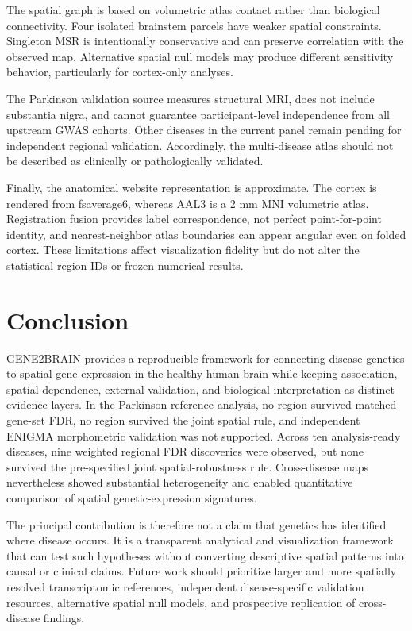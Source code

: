 \documentclass[10pt,twocolumn]{article}
\begin{document}
The spatial graph is based on volumetric atlas contact rather than biological connectivity. Four isolated brainstem parcels have weaker spatial constraints. Singleton MSR is intentionally conservative and can preserve correlation with the observed map. Alternative spatial null models may produce different sensitivity behavior, particularly for cortex-only analyses.

The Parkinson validation source measures structural MRI, does not include substantia nigra, and cannot guarantee participant-level independence from all upstream GWAS cohorts. Other diseases in the current panel remain pending for independent regional validation. Accordingly, the multi-disease atlas should not be described as clinically or pathologically validated.

Finally, the anatomical website representation is approximate. The cortex is rendered from fsaverage6, whereas AAL3 is a 2 mm MNI volumetric atlas. Registration fusion provides label correspondence, not perfect point-for-point identity, and nearest-neighbor atlas boundaries can appear angular even on folded cortex. These limitations affect visualization fidelity but do not alter the statistical region IDs or frozen numerical results.

\section{Conclusion}

GENE2BRAIN provides a reproducible framework for connecting disease genetics to spatial gene expression in the healthy human brain while keeping association, spatial dependence, external validation, and biological interpretation as distinct evidence layers. In the Parkinson reference analysis, no region survived matched gene-set FDR, no region survived the joint spatial rule, and independent ENIGMA morphometric validation was not supported. Across ten analysis-ready diseases, nine weighted regional FDR discoveries were observed, but none survived the pre-specified joint spatial-robustness rule. Cross-disease maps nevertheless showed substantial heterogeneity and enabled quantitative comparison of spatial genetic-expression signatures.

The principal contribution is therefore not a claim that genetics has identified where disease occurs. It is a transparent analytical and visualization framework that can test such hypotheses without converting descriptive spatial patterns into causal or clinical claims. Future work should prioritize larger and more spatially resolved transcriptomic references, independent disease-specific validation resources, alternative spatial null models, and prospective replication of cross-disease findings.
\end{document}
